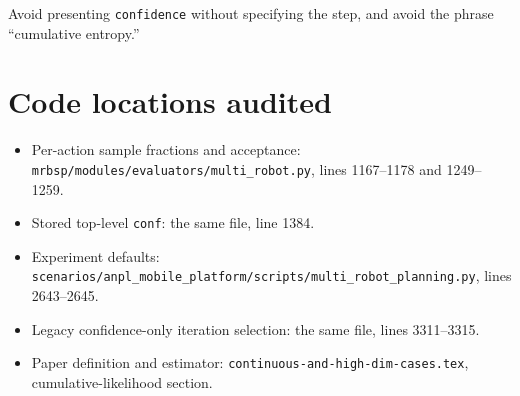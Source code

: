 \documentclass[11pt,a4paper]{article}
\begin{document}
Avoid presenting \texttt{confidence} without specifying the step, and avoid
the phrase ``cumulative entropy.''

\section{Code locations audited}

\begin{itemize}
    \item Per-action sample fractions and acceptance:
    \texttt{mrbsp/modules/evaluators/multi\_robot.py}, lines 1167--1178 and
    1249--1259.
    \item Stored top-level \texttt{conf}:
    the same file, line 1384.
    \item Experiment defaults:
    \texttt{scenarios/anpl\_mobile\_platform/scripts/multi\_robot\_planning.py},
    lines 2643--2645.
    \item Legacy confidence-only iteration selection:
    the same file, lines 3311--3315.
    \item Paper definition and estimator:
    \texttt{continuous-and-high-dim-cases.tex}, cumulative-likelihood section.
\end{itemize}
\end{document}
